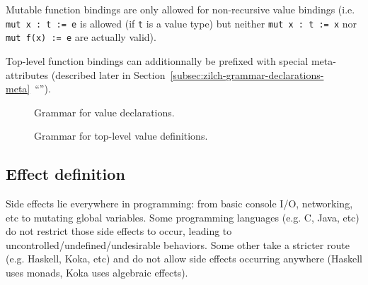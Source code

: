 Mutable function bindings are only allowed for non-recursive value bindings (i.e. \texttt{mut x : t := e} is allowed (if \verb|t| is a value type) but neither \texttt{mut x : t := x} nor \texttt{mut f(x) := e} are actually valid).

Top-level function bindings can additionnally be prefixed with special meta-attributes (described later in Section~\ref{subsec:zilch-grammar-declarations-meta}~``'').

\begin{figure}[H]
	\centering


	\caption{Grammar for value declarations.}
	\label{fig:zilch-grammar-declarations-value-grammar}
\end{figure}

\begin{figure}[H]
	\centering


	\caption{Grammar for top-level value definitions.}
	\label{fig:zilch-grammar-declarations-value-toplevel-grammar}
\end{figure}

\subsection{Effect definition}\label{subsec:zilch-grammar-declaration-effect}

Side effects lie everywhere in programming: from basic console I/O, networking, etc to mutating global variables.
Some programming languages (e.g. C, Java, etc) do not restrict those side effects to occur, leading to uncontrolled/undefined/undesirable behaviors.
Some other take a stricter route (e.g. Haskell, Koka, etc) and do not allow side effects occurring anywhere (Haskell uses monads, Koka uses algebraic effects).

